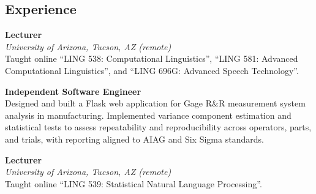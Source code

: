 \documentclass{article}
\newcommand{\entrysep}{\vspace{1.1em}}
\begin{document}
\begin{minipage}[t]{0.68\textwidth}
\small
\subsection*{Experience}

\textbf{Lecturer} \hfill {} \\
\textit{University of Arizona, Tucson, AZ (remote)} \\
Taught online ``LING 538: Computational Linguistics'', ``LING 581: Advanced Computational Linguistics'', and ``LING 696G: Advanced Speech Technology''.

\entrysep
\textbf{Independent Software Engineer} \hfill {} \\
Designed and built a Flask web application for Gage R\&R measurement system analysis in manufacturing. Implemented variance component estimation and statistical tests to assess repeatability and reproducibility across operators, parts, and trials, with reporting aligned to AIAG and Six Sigma standards.

\entrysep
\textbf{Lecturer} \hfill {} \\
\textit{University of Arizona, Tucson, AZ (remote)} \\
Taught online ``LING 539: Statistical Natural Language Processing''.


\end{minipage}
\end{document}
